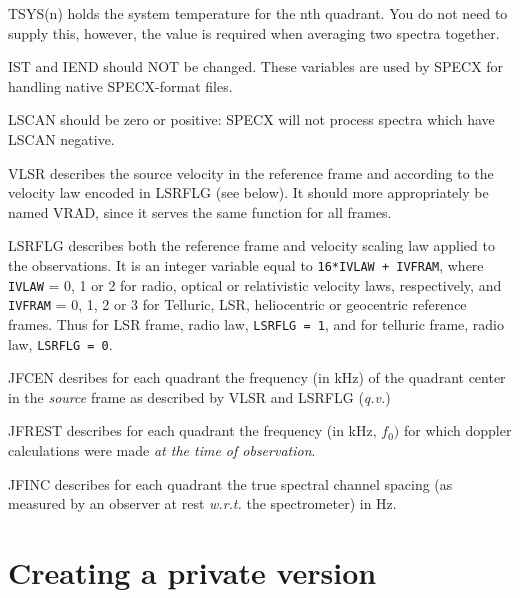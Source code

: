 \documentclass[11pt,twoside]{report}
\begin{document}
\begin{description}
\item {} TSYS(n) holds the system temperature for the nth quadrant. 
        You do not need to supply this, however,
        the value is required when averaging two spectra
        together.

\item {} IST and IEND should NOT be changed. These variables are used
         by SPECX for handling native SPECX-format files.

\item {} LSCAN should be zero or positive: SPECX will not process spectra
         which have LSCAN negative.

\item {} VLSR describes the source velocity in the reference frame and
         according to the velocity law encoded in LSRFLG (see below). It
         should more appropriately be named VRAD, since it serves the same
         function for all frames.

\item {} LSRFLG describes both the reference frame and velocity scaling law
         applied to the observations. It is an integer variable equal to 
         \verb$16*IVLAW + IVFRAM$, where \verb+IVLAW+ = 0, 1 or 2 for
         radio, optical or relativistic velocity laws, respectively, and
         \verb+IVFRAM+ = 0, 1, 2 or 3 for Telluric, LSR, heliocentric
         or geocentric reference frames. Thus for LSR frame, radio law,
         \verb+LSRFLG = 1+, and for telluric frame, radio law,
         \verb+LSRFLG = 0+.

\item {} JFCEN desribes for each quadrant the frequency (in kHz) of the
         quadrant center in the {\em source} frame as described by VLSR
         and LSRFLG ({\em q.v.})

\item {} JFREST describes for each quadrant the frequency (in kHz, $f_0)$ for which
         doppler calculations were made {\em at the time of observation}.

\item {} JFINC describes for each quadrant the true spectral channel spacing
         (\ie as measured by an observer at rest {\em w.r.t.} the spectrometer)
         in Hz.

\end{description}

\newpage
\chapter{Creating a private version} 
\end{document}
